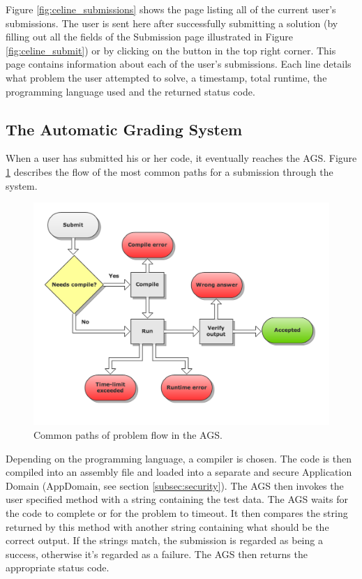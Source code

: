 Figure \ref{fig:celine_submissions} shows the page listing all of the current user's submissions. The user is sent here after successfully submitting a solution (by filling out all the fields of the Submission page illustrated in Figure \ref{fig:celine_submit}) or by clicking on the button in the top right corner. This page contains information about each of the user's submissions. Each line details what problem the user attempted to solve, a timestamp, total runtime, the programming language used and the returned status code. 


\subsection{The Automatic Grading System}
When a user has submitted his or her code, it eventually reaches the AGS. Figure \ref{fig:flowchart} describes the flow of the most common paths for a submission through the system.

\begin{figure}[h]
	\centering
	\includegraphics[width=0.8\linewidth]{chapters/media/flowchart.png}
	\caption{Common paths of problem flow in the AGS.}
	\label{fig:flowchart}
\end{figure}

Depending on the programming language, a compiler is chosen. The code is then compiled into an assembly file and loaded into a separate and secure Application Domain (AppDomain, see section \ref{subsec:security}). The AGS then invokes the user specified method with a string containing the test data. The AGS waits for the code to complete or for the problem to timeout. It then compares the string returned by this method with another string containing what should be the correct output. If the strings match, the submission is regarded as being a success, otherwise it's regarded as a failure. The AGS then returns the appropriate status code. 


